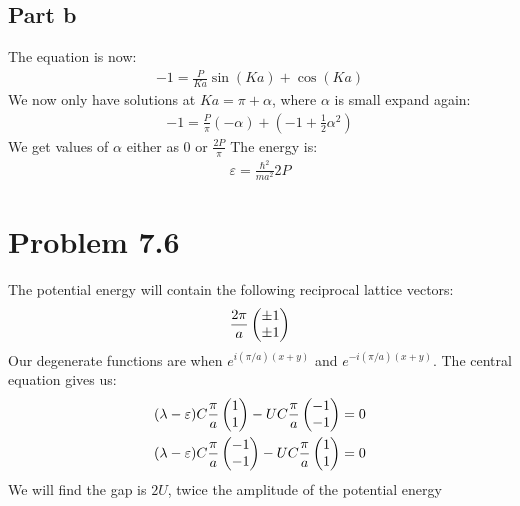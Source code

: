 \documentclass[12pt]{article}
\begin{document}
\subsection{Part b}
The equation is now:
\begin{align*}
  -1=\frac{P}{Ka}\sin(Ka)+\cos(Ka)
\end{align*}
We now only have solutions at $Ka=\pi+\alpha$, where $\alpha$ is small expand again:
\begin{align*}
  -1=\frac{P}{\pi}(-\alpha)+(-1+\frac{1}{2}\alpha^2)
\end{align*}
We get values of $\alpha$ either as $0$ or $\frac{2P}{\pi}$
The energy is:
\begin{align*}
  \boxed{\varepsilon = \frac{\hbar^2}{ma^2}2P}
\end{align*}
\section{Problem 7.6}
The potential energy will contain the following reciprocal lattice vectors:
\begin{align*}
  \frac{2\pi}{a}\pmqty{\pm1\\\pm1}
\end{align*}
Our degenerate functions are when $e^{i(\pi/a)(x+y)}$ and $e^{-i(\pi/a)(x+y)}$.
The central equation gives us:
\begin{align*}
  (\lambda-\varepsilon)C\frac{\pi}{a}\pmqty{1\\1}-
  UC\frac{\pi}{a}\pmqty{-1\\-1}&=0\\
  (\lambda-\varepsilon)C\frac{\pi}{a}\pmqty{-1\\-1}-
  UC\frac{\pi}{a}\pmqty{1\\1}&=0
\end{align*}
We will find the gap is $\boxed{2U}$, twice the amplitude of the potential energy
\end{document}
